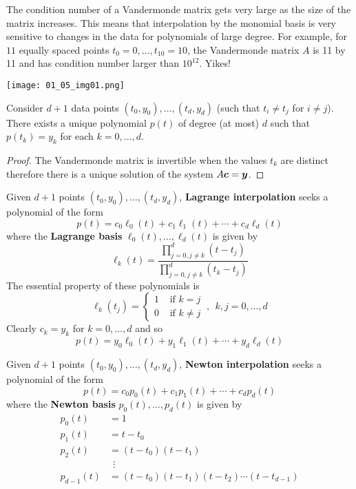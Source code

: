 \begin{note}
The condition number of a Vandermonde matrix gets very large as the size of the matrix increases. This means that interpolation by the monomial basis is very sensitive to changes in the data for polynomials of large degree. For example, for $11$ equally spaced points $t_0=0,\dots,t_{10}=10$, the Vandermonde matrix $A$ is 11 by 11 and has condition number larger than $10^{12}$. Yikes!
\begin{center}
\texttt{[image: 01\_05\_img01.png]}
\end{center}
\end{note}

\begin{proposition}
Consider $d+1$ data points $(t_0,y_0), \dots , (t_d,y_d)$ (such that $t_i \not= t_j$ for $i \not= j$). There exists a unique polynomial $p(t)$ of degree (at most) $d$ such that $p(t_k) = y_k$ for each $k=0,\dots,d$.

\begin{proof}
The Vandermonde matrix is invertible when the values $t_k$ are distinct therefore there is a unique solution of the system $A \boldsymbol{c} = \boldsymbol{y}$.
\end{proof}
\end{proposition}

\begin{definition}
Given $d+1$ points $(t_0,y_0), \dots , (t_d,y_d)$, {\bf Lagrange interpolation} \cite[p.315]{MH} seeks a polynomial of the form
$$
p(t) = c_0 \ell_0(t) + c_1 \ell_1(t) + \cdots + c_d \ell_d(t)
$$
where the {\bf Lagrange basis} $\ell_0(t),\dots,\ell_d(t)$ is given by
$$
\ell_k(t) = \frac{\prod_{j=0, j\not=k}^d (t - t_j)}{\prod_{j=0, j\not=k}^d (t_k - t_j)}
$$
The essential property of these polynomials is
$$
\ell_k(t_j) = \left\{ \begin{array}{cc} 1 & \text{ if } k = j \\ 0 & \text{ if } k \not= j \end{array} \right. \ , \ \ k,j=0,\dots,d
$$
Clearly $c_k = y_k$ for $k=0,\dots,d$ and so
$$
p(t) = y_0 \ell_0(t) + y_1 \ell_1(t) + \cdots + y_d \ell_d(t)
$$
\end{definition}

\begin{definition}
Given $d+1$ points $(t_0,y_0), \dots , (t_d,y_d)$, {\bf Newton interpolation} \cite[p.317]{MH} seeks a polynomial of the form
$$
p(t) = c_0 p_0(t) + c_1 p_1(t) + \cdots + c_d p_d(t)
$$
where the {\bf Newton basis} $p_0(t),\dots,p_d(t)$ is given by
\begin{align*}
p_0(t) &= 1 \\
p_1(t) &= t - t_0 \\
p_2(t) &= (t - t_0)(t - t_1) \\
 & \ \ \vdots \\
p_{d-1}(t) &= (t - t_0)(t - t_1)(t - t_2) \cdots (t - t_{d-1}) \\
\end{align*}
\end{definition}

